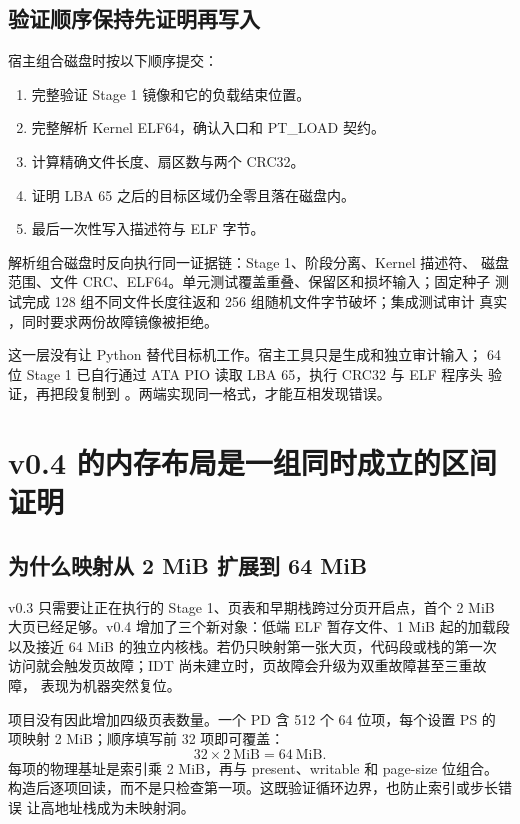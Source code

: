 \subsection{验证顺序保持先证明再写入}

宿主组合磁盘时按以下顺序提交：

\begin{enumerate}[label=\arabic*.]
  \item 完整验证 Stage 1 镜像和它的负载结束位置。
  \item 完整解析 Kernel ELF64，确认入口和 PT\_LOAD 契约。
  \item 计算精确文件长度、扇区数与两个 CRC32。
  \item 证明 LBA 65 之后的目标区域仍全零且落在磁盘内。
  \item 最后一次性写入描述符与 ELF 字节。
\end{enumerate}

解析组合磁盘时反向执行同一证据链：Stage 1、阶段分离、Kernel 描述符、
磁盘范围、文件 CRC、ELF64。单元测试覆盖重叠、保留区和损坏输入；固定种子
测试完成 128 组不同文件长度往返和 256 组随机文件字节破坏；集成测试审计
真实 ，同时要求两份故障镜像被拒绝。

这一层没有让 Python 替代目标机工作。宿主工具只是生成和独立审计输入；
64 位 Stage 1 已自行通过 ATA PIO 读取 LBA 65，执行 CRC32 与 ELF 程序头
验证，再把段复制到 。两端实现同一格式，才能互相发现错误。

\section{v0.4 的内存布局是一组同时成立的区间证明}

\subsection{为什么映射从 2 MiB 扩展到 64 MiB}

v0.3 只需要让正在执行的 Stage 1、页表和早期栈跨过分页开启点，首个 2 MiB
大页已经足够。v0.4 增加了三个新对象：低端 ELF 暂存文件、1 MiB 起的加载段
以及接近 64 MiB 的独立内核栈。若仍只映射第一张大页，代码段或栈的第一次
访问就会触发页故障；IDT 尚未建立时，页故障会升级为双重故障甚至三重故障，
表现为机器突然复位。

项目没有因此增加四级页表数量。一个 PD 含 512 个 64 位项，每个设置 PS 的
项映射 2 MiB；顺序填写前 32 项即可覆盖：
\[
  32\times 2\ \mathrm{MiB}=64\ \mathrm{MiB}.
\]
每项的物理基址是索引乘 2 MiB，再与 present、writable 和 page-size 位组合。
构造后逐项回读，而不是只检查第一项。这既验证循环边界，也防止索引或步长错误
让高地址栈成为未映射洞。


